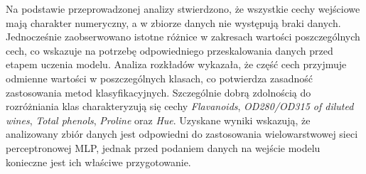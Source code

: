 \begin{table}[htbp]
    \centering
    \caption{Descriptive statistics for entire dataset.}
    \label{tab:all_statistics}
    \scriptsize
    \setlength{\tabcolsep}{3pt}
    \renewcommand{\arraystretch}{1.0}
    \resizebox{\textwidth}{!}{%
        
    }
\end{table}

\begin{table}[htbp]
    \centering
    \caption{Descriptive statistics for class 1.}
    \label{tab:target1_statistics}
    \scriptsize
    \setlength{\tabcolsep}{3pt}
    \renewcommand{\arraystretch}{1.0}
    \resizebox{\textwidth}{!}{%
        
    }
\end{table}

\begin{table}[htbp]
    \centering
    \caption{Descriptive statistics for class 2.}
    \label{tab:target2_statistics}
    \scriptsize
    \setlength{\tabcolsep}{3pt}
    \renewcommand{\arraystretch}{1.0}
    \resizebox{\textwidth}{!}{%
        
    }
\end{table}

\begin{table}[htbp]
    \centering
    \caption{Descriptive statistics for class 3.}
    \label{tab:target3_statistics}
    \scriptsize
    \setlength{\tabcolsep}{3pt}
    \renewcommand{\arraystretch}{1.0}
    \resizebox{\textwidth}{!}{%
        
    }
\end{table}

\FloatBarrier

Na podstawie przeprowadzonej analizy stwierdzono, że wszystkie cechy wejściowe mają charakter numeryczny, a w zbiorze danych nie występują braki danych. Jednocześnie zaobserwowano istotne różnice w zakresach wartości poszczególnych cech, co wskazuje na potrzebę odpowiedniego przeskalowania danych przed etapem uczenia modelu. Analiza rozkładów wykazała, że część cech przyjmuje odmienne wartości w poszczególnych klasach, co potwierdza zasadność zastosowania metod klasyfikacyjnych. Szczególnie dobrą zdolnością do rozróżniania klas charakteryzują się cechy \textit{Flavanoids}, \textit{OD280/OD315 of diluted wines}, \textit{Total phenols}, \textit{Proline} oraz \textit{Hue}. Uzyskane wyniki wskazują, że analizowany zbiór danych jest odpowiedni do zastosowania wielowarstwowej sieci perceptronowej MLP, jednak przed podaniem danych na wejście modelu konieczne jest ich właściwe przygotowanie.